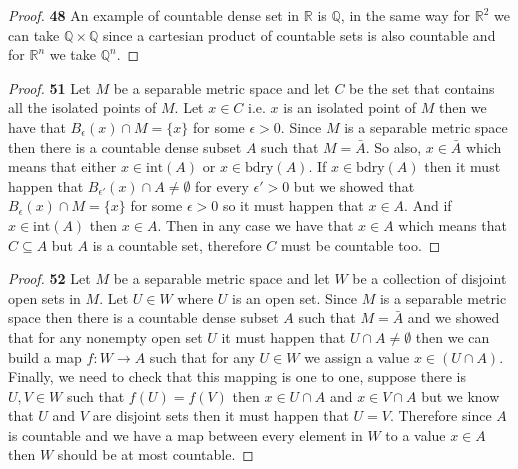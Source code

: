 \documentclass[11pt]{article}
\newcommand{\Q}{\mathbb{Q}}
\newcommand{\R}{\mathbb{R}}
\newcommand{\bdry}{\text{bdry}}
\newcommand{\inter}{\text{int}}
\theoremstyle{definition}
\begin{document}
    \begin{proof}{\textbf{48}}
        An example of countable dense set in $\R$ is $\Q$, in the same way
        for $\R^2$ we can take $\Q \times \Q$ since a cartesian product of
        countable sets is also countable and for $\R^n$ we take $\Q^n$.
    \end{proof}
\cleardoublepage
    \begin{proof}{\textbf{51}}
        Let $M$ be a separable metric space and let $C$ be the set that contains
        all the isolated points of $M$. Let $x \in C$ i.e. $x$ is an isolated
        point of $M$ then we have that $B_{\epsilon}(x) \cap M = \{x\}$
        for some $\epsilon > 0$. Since $M$ is a separable metric space
        then there is a countable dense subset $A$ such that $M = \bar{A}$.
        So also, $x \in \bar{A}$ which means that either $x \in \inter(A)$ or
        $x \in \bdry(A)$. If $x \in \bdry(A)$ then it must happen that
        $B_{\epsilon'}(x) \cap A \neq \emptyset$ for every $\epsilon' > 0$ but we
        showed that $B_{\epsilon}(x) \cap M = \{x\}$ for some $\epsilon>0$ 
        so it must happen that $x \in A$. And if $x \in \inter(A)$ then
        $x \in A$. Then in any case we have that $x \in A$ which means that
        $C \subseteq A$ but $A$ is a countable set, therefore $C$ must be
        countable too.
    \end{proof}
    \begin{proof}{\textbf{52}}
        Let $M$ be a separable metric space and let $W$ be a collection of
        disjoint open sets in $M$. Let $U \in W$ where $U$ is an open set.
        Since $M$ is a separable metric space then there is a countable dense
        subset $A$ such that $M = \bar{A}$ and we showed that for any nonempty
        open set $U$ it must happen that $U \cap A \neq \emptyset$ then we can
        build a map $f:W \to A$ such that for any $U \in W$ we assign a value
        $x \in (U \cap A)$. Finally, we need to check that this mapping
        is one to one, suppose there is $U, V \in W$ such that $f(U) = f(V)$
        then $x \in U \cap A$ and $x \in V \cap A$ but
        we know that $U$ and $V$ are disjoint sets then it must happen that
        $U = V$.
        Therefore since $A$ is countable and we have a map between every element
        in $W$ to a value $x \in A$ then $W$ should be at most countable. 
    \end{proof}
\cleardoublepage
\end{document}
